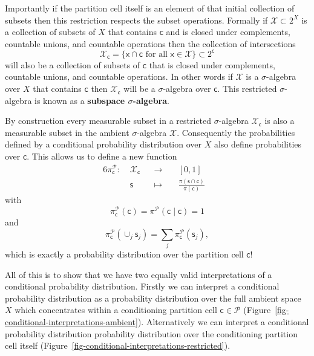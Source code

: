 \documentclass[
  letterpaper,
  DIV=11,
  numbers=noendperiod]{scrartcl}
\begin{document}
Importantly if the partition cell itself is an element of that initial
collection of subsets then this restriction respects the subset
operations. Formally if \(\mathcal{X} \subset 2^{X}\) is a collection of
subsets of \(X\) that contains \(\mathsf{c}\) and is closed under
complements, countable unions, and countable operations then the
collection of intersections \[
\mathcal{X}_{\mathsf{c}}
=
\{ \mathsf{x} \cap \mathsf{c} \text{ for all }
   \mathsf{x} \in \mathcal{X} \} \subset 2^{\mathsf{c}}
\] will also be a collection of subsets of \(\mathsf{c}\) that is closed
under complements, countable unions, and countable operations. In other
words if \(\mathcal{X}\) is a \(\sigma\)-algebra over \(X\) that
contains \(\mathsf{c}\) then \(\mathcal{X}_{\mathsf{c}}\) will be a
\(\sigma\)-algebra over \(\mathsf{c}\). This restricted
\(\sigma\)-algebra is known as a \textbf{subspace \(\sigma\)-algebra}.

By construction every measurable subset in a restricted
\(\sigma\)-algebra \(\mathcal{X}_{\mathsf{c}}\) is also a measurable
subset in the ambient \(\sigma\)-algebra \(\mathcal{X}\). Consequently
the probabilities defined by a conditional probability distribution over
\(X\) also define probabilities over \(\mathsf{c}\). This allows us to
define a new function \begin{alignat*}{6}
\pi^{\mathcal{P}}_{\mathsf{c}}
:\; &\mathcal{X}_{\mathsf{c}}& &\rightarrow& \; &[0, 1]&
\\
&\mathsf{s}& &\mapsto&
&\frac{ \pi(\mathsf{s} \cap \mathsf{c}) }{ \pi (\mathsf{c}) }&
\end{alignat*} with \[
\pi^{\mathcal{P}}_{\mathsf{c}}( \mathsf{c} )
= \pi^{\mathcal{P}}( \mathsf{c} \mid \mathsf{c} )
= 1
\] and \[
\pi^{\mathcal{P}}_{\mathsf{c}}( \cup_{j} \mathsf{s}_{j} )
= \sum_{j} \pi^{\mathcal{P}}_{\mathsf{c}}( \mathsf{s}_{j} ),
\] which is exactly a probability distribution over the partition cell
\(\mathsf{c}\)!

All of this is to show that we have two equally valid interpretations of
a conditional probability distribution. Firstly we can interpret a
conditional probability distribution as a probability distribution over
the full ambient space \(X\) which concentrates within a conditioning
partition cell \(\mathsf{c} \in \mathcal{P}\)
(Figure~\ref{fig-conditional-interpretations-ambient}). Alternatively we
can interpret a conditional probability distribution probability
distribution over the conditioning partition cell itself
(Figure~\ref{fig-conditional-interpretations-restricted}).
\end{document}
